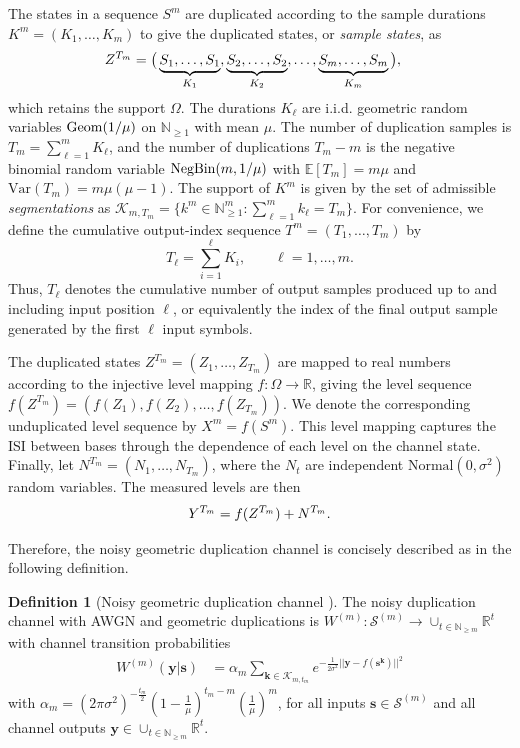 \documentclass[onecolumn]{IEEEtran}
\theoremstyle{definition}
\newtheorem{definition}{Definition}
\begin{document}
The states in a sequence $S^m$ are duplicated according to the sample durations $K^m=(K_1,\ldots,K_m)$ to give the duplicated states, or {\em sample states}, as
\begin{align}
    Z^{T_m}
    =\big(&\underbrace{S_1,\ldots,S_{1}}_{K_1},
    \underbrace{S_{2},\ldots,S_{2}}_{K_2}, \ldots, \underbrace{S_{m},\ldots,S_{m}}_{K_m}\big), \notag
\end{align}
which retains the support $\Omega$. The durations $K_{\ell}$ are i.i.d. geometric random variables ${\rm Geom}(1/\mu)$ on $\mathbb{N}_{\geq 1}$ with mean $\mu$. The number of duplication samples is $T_m =\sum_{\ell=1}^m K_{\ell}$, and the number of duplications $T_m - m$ is the negative binomial random variable ${\rm NegBin}(m,1/\mu)$ with $\mathbb{E}[T_m]=m\mu$ and $\mathrm{Var}(T_m)=m\mu(\mu-1)$. The support of $K^m$ is given by the set of admissible {\em segmentations} as $\mathcal{K}_{m,T_m} = \{k^m\in \mathbb{N}^m_{\geq 1}: \sum_{\ell=1}^{m}k_{\ell}=T_m\}$. For convenience, we define the cumulative output-index sequence
$T^m=(T_1,\ldots,T_m)$ by
\[
    T_\ell = \sum_{i=1}^{\ell} K_i, \qquad \ell=1,\ldots,m .
\]
Thus, $T_\ell$ denotes the cumulative number of output samples produced up to and including
input position $\ell$, or equivalently the index of the final output sample
generated by the first $\ell$ input symbols.

The duplicated states $Z^{T_m}{=(Z_1,\ldots,Z_{T_m})}$ are mapped to real numbers according to the {{injective}} level mapping $f:\Omega\rightarrow\mathbb{R}$, giving the level sequence $f(Z^{T_m}) = (f(Z_1),f(Z_2),\ldots,f(Z_{T_m}))$. {We denote the corresponding unduplicated level sequence by
$X^m=f(S^m)$.} This level mapping captures the ISI between bases through
the dependence of each level on the channel state.
{
Finally, let $N^{T_m}=(N_1,\ldots,N_{T_m})$, where the $N_t$ are independent
$\mathrm{Normal}(0,\sigma^2)$ random variables. The measured levels are then
}
\begin{align}
    Y^{T_m} = f(Z^{T_m}) + N^{T_m}.\notag
\end{align}

Therefore, the noisy geometric duplication channel is concisely described as in the following definition. 


\begin{definition}[Noisy geometric duplication channel \cite{McBain2025JSAIT}]\label{def:nnc}
    The noisy duplication channel with AWGN and geometric duplications is  $W^{(m)} : \mathcal{S}^{(m)} \rightarrow \cup_{t\in \mathbb{N}_{\geq m}}\mathbb{R}^{t}$ with channel transition probabilities
\begin{align}\label{eq:W}
    W^{(m)}(\mathbf{y}|\mathbf{s})
    &= \alpha_m \sum_{\mathbf{k}\in\mathcal{K}_{m,t_m}} e^{-\frac{1}{2\sigma^2}||\mathbf{y} - f(\mathbf{s}^\mathbf{k})||^2}
\end{align}
with $\alpha_m = (2\pi \sigma^2)^{-\frac{t_m}{2}} (1-\frac{1}{\mu})^{t_m - m} (\frac{1}{\mu})^m$, for all inputs $\mathbf{s} \in \mathcal{S}^{(m)}$ and all channel outputs $\mathbf{y}\in \cup_{t\in \mathbb{N}_{\geq m}} \mathbb{R}^t$. 
\end{definition}
\end{document}
